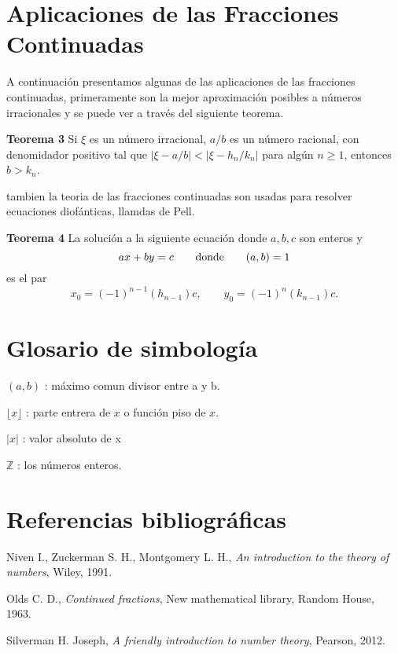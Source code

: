 \documentclass[11pt, article]{article}
\begin{document}
    \section*{Aplicaciones de las Fracciones Continuadas}
     A continuación presentamos algunas de las aplicaciones de las fracciones continuadas, primeramente son la mejor aproximación posibles a números irracionales y se puede ver a través del siguiente teorema.
     
     \textbf{Teorema 3} Si $\xi$ es un número irracional, $a/b$ es un número racional, con denomidador positivo tal que $|\xi - a/b|<|\xi-h_n/k_n|$ para algún $n\geq 1$, entonces $b>k_n$.
     
     tambien la teoria de las fracciones continuadas son usadas para resolver ecuaciones diofánticas, llamdas de Pell.
     
    \textbf{Teorema 4} La solución a la siguiente ecuación donde $a,b,c$ son enteros y 
     \[
     ax+by=c \qquad \textnormal{donde} \qquad (a,b)=1
     \] 
     es el par
     \[
     x_0 = (-1)^{n-1} (h_{n-1})c, \qquad y_0=(-1)^n (k_{n-1})c.
     \]
     
     \section*{Glosario de simbología}
     
     $(a,b)$ : máximo comun divisor entre a y b.
     
     $\lfloor x \rfloor$ : parte entrera  de $x$ o función piso de $x$.
     
     $|x|$ : valor absoluto de x
     
     $\mathbb{Z}$ : los números enteros.
     
     
     \section*{Referencias bibliográficas}
     Niven I., Zuckerman S. H., Montgomery L. H., \textit{An introduction to the theory of numbers}, Wiley, 1991.
    
      Olds C. D., \textit{Continued fractions}, New mathematical library, Random House, 1963.
     
     Silverman H. Joseph, \textit{A friendly introduction to number theory}, Pearson, 2012.
    
\end{document}
